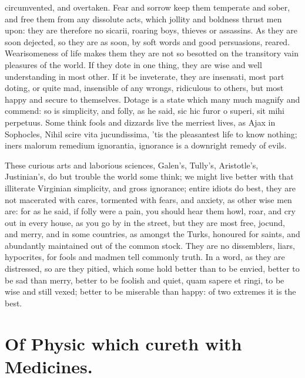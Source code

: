 {circumvented, and overtaken. Fear and sorrow keep them temperate and
sober, and free them from any dissolute acts, which jollity and
boldness thrust men upon: they are therefore no sicarii, roaring boys,
thieves or assassins. As they are soon dejected, so they are as soon,
by soft words and good persuasions, reared. Wearisomeness of life makes
them they are not so besotted on the transitory vain pleasures of the
world. If they dote in one thing, they are wise and well understanding
in most other. If it be inveterate, they are insensati, most part
doting, or quite mad, insensible of any wrongs, ridiculous to others,
but most happy and secure to themselves. Dotage is a state which many
much magnify and commend: so is simplicity, and folly, as he said,
sic hic furor o superi, sit mihi perpetuus. Some think fools and
dizzards live the merriest lives, as Ajax in Sophocles, Nihil scire
vita jucundissima, 'tis the pleasantest life to know nothing; iners
malorum remedium ignorantia, ignorance is a downright remedy of evils.

These curious arts and laborious sciences, Galen's, Tully's,
Aristotle's, Justinian's, do but trouble the world some think; we might
live better with that illiterate Virginian simplicity, and gross
ignorance; entire idiots do best, they are not macerated with cares,
tormented with fears, and anxiety, as other wise men are: for as
he said, if folly were a pain, you should hear them howl, roar,
and cry out in every house, as you go by in the street, but they are
most free, jocund, and merry, and in some countries, as amongst
the Turks, honoured for saints, and abundantly maintained out of the
common stock. They are no dissemblers, liars, hypocrites, for
fools and madmen tell commonly truth. In a word, as they are
distressed, so are they pitied, which some hold better than to be
envied, better to be sad than merry, better to be foolish and quiet,
quam sapere et ringi, to be wise and still vexed; better to be
miserable than happy: of two extremes it is the best.



\section{Of Physic which cureth with Medicines.}

}
